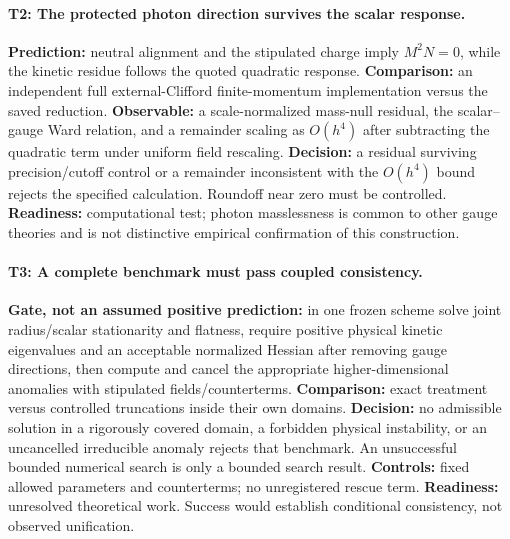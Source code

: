 \paragraph{T2: The protected photon direction survives the scalar response.}
\textbf{Prediction:} neutral alignment and the stipulated charge imply $M^2N=0$, while the kinetic residue follows the quoted quadratic response. \textbf{Comparison:} an independent full external-Clifford finite-momentum implementation versus the saved reduction. \textbf{Observable:} a scale-normalized mass-null residual, the scalar--gauge Ward relation, and a remainder scaling as $O(h^4)$ after subtracting the quadratic term under uniform field rescaling. \textbf{Decision:} a residual surviving precision/cutoff control or a remainder inconsistent with the $O(h^4)$ bound rejects the specified calculation. Roundoff near zero must be controlled. \textbf{Readiness:} computational test; photon masslessness is common to other gauge theories and is not distinctive empirical confirmation of this construction.

\paragraph{T3: A complete benchmark must pass coupled consistency.}
\textbf{Gate, not an assumed positive prediction:} in one frozen scheme solve joint radius/scalar stationarity and flatness, require positive physical kinetic eigenvalues and an acceptable normalized Hessian after removing gauge directions, then compute and cancel the appropriate higher-dimensional anomalies with stipulated fields/counterterms. \textbf{Comparison:} exact treatment versus controlled truncations inside their own domains. \textbf{Decision:} no admissible solution in a rigorously covered domain, a forbidden physical instability, or an uncancelled irreducible anomaly rejects that benchmark. An unsuccessful bounded numerical search is only a bounded search result. \textbf{Controls:} fixed allowed parameters and counterterms; no unregistered rescue term. \textbf{Readiness:} unresolved theoretical work. Success would establish conditional consistency, not observed unification.

